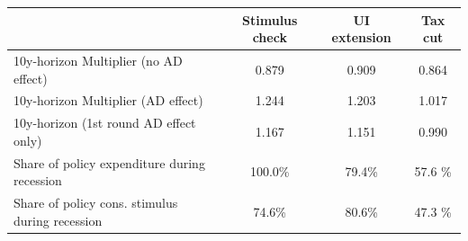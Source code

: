 \begin{tabular}{@{}lccc@{}} 
\toprule 
& Stimulus check    & UI extension    & Tax cut     \\  \midrule 
10y-horizon Multiplier (no AD effect) &0.879  & 0.909  & 0.864     \\ 
10y-horizon Multiplier (AD effect) &1.244  & 1.203  & 1.017     \\ 
10y-horizon (1st round AD effect only) &1.167  & 1.151  & 0.990     \\ 
Share of policy expenditure during recession &100.0\%  & 79.4\%  & 57.6 \%    \\ 
Share of policy cons. stimulus during recession &74.6\%  & 80.6\%  & 47.3 \%    \\ \bottomrule 
\end{tabular}  
